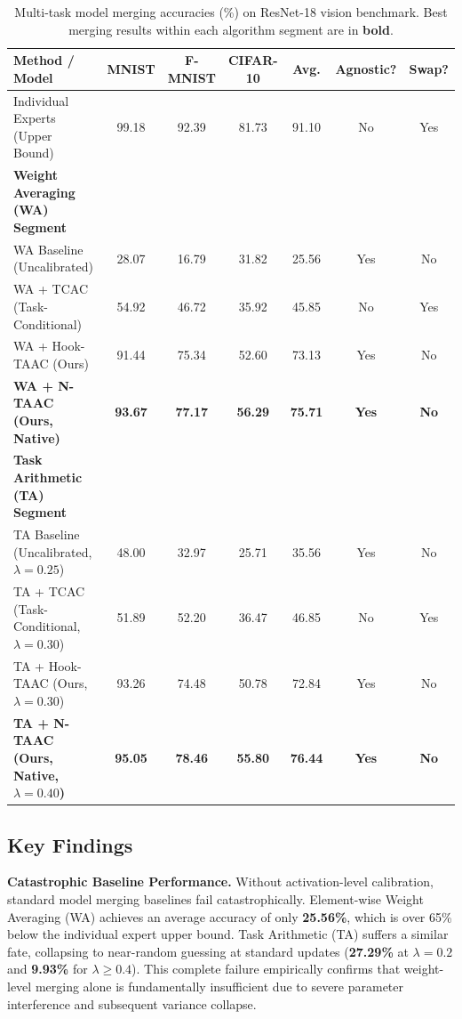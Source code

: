 \documentclass{article}
\theoremstyle{plain}
\theoremstyle{definition}
\theoremstyle{remark}
\begin{document}
\begin{table}[t]
\caption{Multi-task model merging accuracies (\%) on ResNet-18 vision benchmark. Best merging results within each algorithm segment are in \textbf{bold}.}
\label{tab-main-results}
\begin{center}
\begin{small}
\begin{sc}
\begin{tabular}{lcccccc}
\toprule
Method / Model & MNIST & F-MNIST & CIFAR-10 & Avg. & Agnostic? & Swap? \\
\midrule
Individual Experts (Upper Bound) & 99.18 & 92.39 & 81.73 & 91.10 & No & Yes \\
\midrule
\textbf{Weight Averaging (WA) Segment} & & & & & & \\
WA Baseline (Uncalibrated) & 28.07 & 16.79 & 31.82 & 25.56 & Yes & No \\
WA + TCAC (Task-Conditional) & 54.92 & 46.72 & 35.92 & 45.85 & No & Yes \\
WA + Hook-TAAC (Ours) & 91.44 & 75.34 & 52.60 & 73.13 & Yes & No \\
\textbf{WA + N-TAAC (Ours, Native)} & \textbf{93.67} & \textbf{77.17} & \textbf{56.29} & \textbf{75.71} & \textbf{Yes} & \textbf{No} \\
\midrule
\textbf{Task Arithmetic (TA) Segment} & & & & & & \\
TA Baseline (Uncalibrated, $\lambda = 0.25$) & 48.00 & 32.97 & 25.71 & 35.56 & Yes & No \\
TA + TCAC (Task-Conditional, $\lambda = 0.30$) & 51.89 & 52.20 & 36.47 & 46.85 & No & Yes \\
TA + Hook-TAAC (Ours, $\lambda = 0.30$) & 93.26 & 74.48 & 50.78 & 72.84 & Yes & No \\
\textbf{TA + N-TAAC (Ours, Native, $\lambda = 0.40$)} & \textbf{95.05} & \textbf{78.46} & \textbf{55.80} & \textbf{76.44} & \textbf{Yes} & \textbf{No} \\
\bottomrule
\end{tabular}
\end{sc}
\end{small}
\end{center}
\end{table}

\subsection{Key Findings}

\textbf{Catastrophic Baseline Performance.} Without activation-level calibration, standard model merging baselines fail catastrophically. Element-wise Weight Averaging (WA) achieves an average accuracy of only \textbf{25.56\%}, which is over 65\% below the individual expert upper bound. Task Arithmetic (TA) suffers a similar fate, collapsing to near-random guessing at standard updates (\textbf{27.29\%} at $\lambda=0.2$ and \textbf{9.93\%} for $\lambda \ge 0.4$). This complete failure empirically confirms that weight-level merging alone is fundamentally insufficient due to severe parameter interference and subsequent variance collapse.
\end{document}
